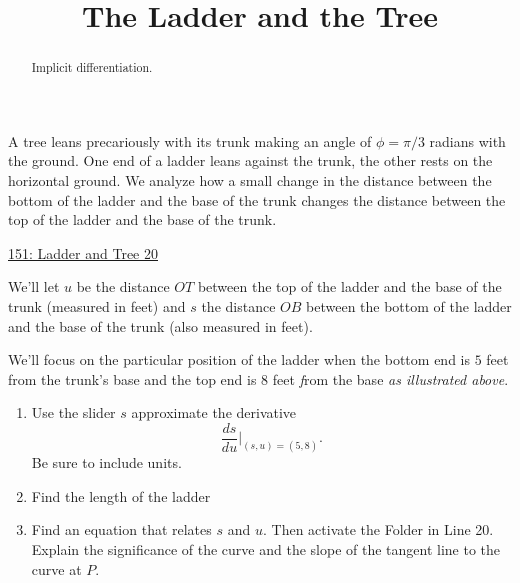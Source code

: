 \documentclass{ximera}
\title{The Ladder and the Tree}
\begin{document}
\begin{abstract}
Implicit differentiation.
\end{abstract}
\maketitle

\begin{question} \label{Q43hhbnhhnnzzz}

A tree leans precariously with its trunk making an angle of $\phi = \pi/3$ radians with the ground. One end of a ladder leans against the trunk, the other rests on the horizontal ground. We analyze how a small change in the distance between the bottom of the ladder and the base of the trunk changes the distance between the top of the ladder and the base of the trunk.


 
\begin{onlineOnly}
   \begin{center}
\end{center}
\end{onlineOnly}

\href{https://www.desmos.com/calculator/yzhhdfdnw5}{151: Ladder and Tree 20}

We'll let $u$ be the distance $OT$ between the top of the ladder and the base of the trunk (measured in feet) and  $s$ the distance $OB$ between the bottom of the ladder and the base of the trunk (also measured in feet).



We'll focus on the particular position of the ladder when the bottom end is $5$ feet from the trunk's base and the top end is $8$ feet \emph from the base \emph{as illustrated above}.

\begin{enumerate}

\item Use the slider $s$ approximate the derivative
\[
\frac{ds}{du}\Big|_{(s,u) = (5,8)} .
\]
Be sure to include units.

\item Find the length of the ladder

\item Find an equation that relates $s$ and $u$. Then activate the Folder in Line 20. Explain the significance of the curve and the slope of the tangent line to the curve at $P$.


\end{enumerate}
\end{question}
\end{document}
